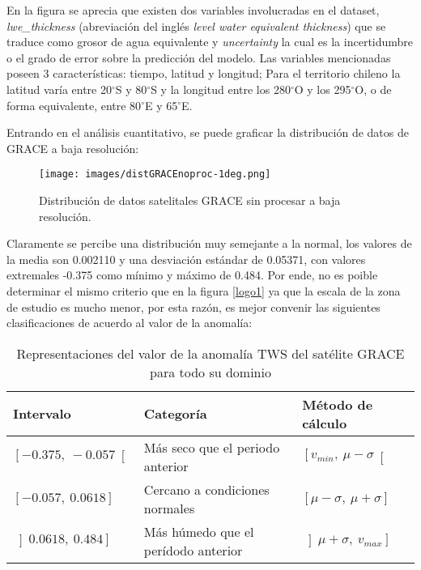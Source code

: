     En la figura se aprecia que existen dos variables involucradas en el dataset, \textit{lwe\_thickness} (abreviación del inglés
    \textit{level water equivalent thickness}) que se traduce como grosor de agua equivalente y \textit{uncertainty} la cual es la incertidumbre
    o el grado de error sobre la predicción del modelo. Las variables mencionadas poseen 3 características: tiempo, latitud y longitud; Para el territorio 
    chileno la latitud varía entre 20$^{\circ}$S y 80$^{\circ}$S y la longitud entre los 280$^{\circ}$O y los 295$^{\circ}$O, o de forma equivalente, entre 
    80$^{\circ}$E y 65$^{\circ}$E.

    Entrando en el análisis cuantitativo, se puede graficar la distribución de datos de GRACE a baja resolución:
    \begin{figure}[h]
        \centering
              \texttt{[image: images/distGRACEnoproc-1deg.png]}
        \caption[Distribución de datos satelitales a baja resolución]{\footnotesize Distribución de datos satelitales GRACE sin procesar a baja resolución.}
    \end{figure}
    
    Claramente se percibe una distribución muy semejante a la normal, los valores de la media son 0.002110 y una desviación estándar de 0.05371, con valores extremales -0.375 como mínimo y 
    máximo de 0.484. Por ende, no es poible determinar el mismo criterio que en la figura \ref{logo1} ya que la escala de la zona de estudio es mucho menor, por esta razón, es mejor convenir las siguientes clasificaciones
    de acuerdo al valor de la anomalía:

    \begin{table}[H] 
        \caption[Rangos de valores de la anomalía TWS en Chile]{Representaciones del valor de la anomalía TWS del satélite GRACE para todo su dominio}
        \begin{tabularx}{0.9\textwidth}{CCC}
        \toprule
        \textbf{Intervalo}	& \textbf{Categoría}	&\textbf{Método de cálculo}\\
            \midrule
            \textbf{$\left[-0\text{.}375,~-0\text{.}057\right[$}    & Más seco que el periodo anterior       & $\left[v_{min},~ \mu - \sigma\right[$\\
            \textbf{$[-0\text{.}057,~0\text{.}0618]$}	            & Cercano a condiciones normales         & $[\mu - \sigma,~ \mu +\sigma]$ \\
            \textbf{$\left]0\text{.}0618,~0\text{.}484\right] $}    & Más húmedo que el perídodo anterior    & $\left]\mu +\sigma,~v_{max}\right]$\\
            \bottomrule
        \end{tabularx}
    \end{table}
    
